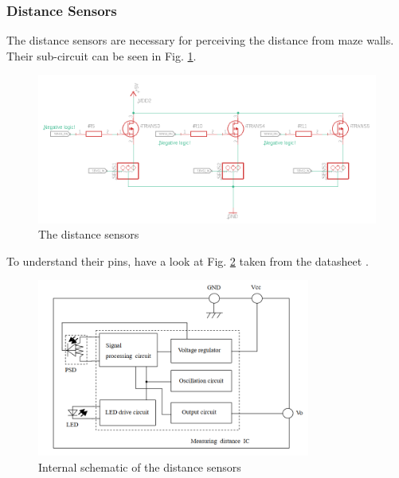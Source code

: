 \FloatBarrier
\vspace{1cm}


\subsubsection{Distance Sensors}

The distance sensors are necessary for perceiving the distance from maze walls. Their sub-circuit can be seen in Fig. \ref{fig:sensors}.

\begin{figure}[htb]
    \centering
    \includegraphics[width=1\textwidth]{figures/hardware/DistanceSensors.PNG}
    \caption{The distance sensors}
    \label{fig:sensors}
\end{figure}

\FloatBarrier

To understand their pins, have a look at Fig. \ref{fig:sensorsData} taken from the datasheet \cite{sens}.

\begin{figure}[htb]
    \centering
    \includegraphics[width=0.8\textwidth]{figures/hardware/sensorData.PNG}
    \caption{Internal schematic of the distance sensors}
    \label{fig:sensorsData}
\end{figure}

